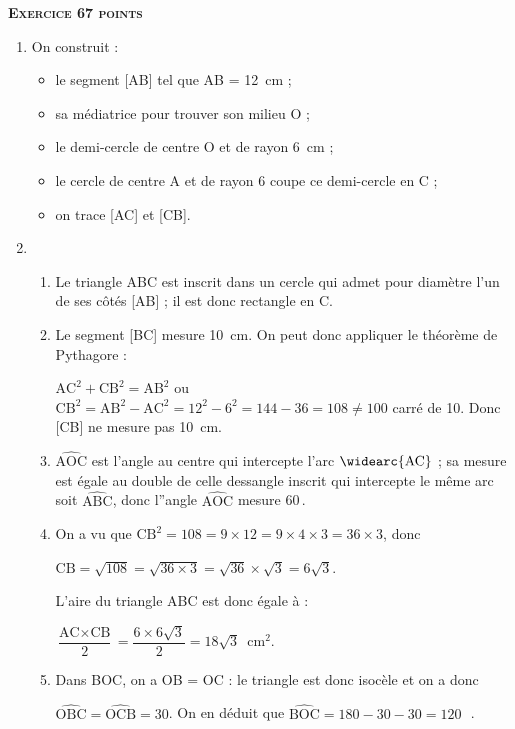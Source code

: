 \textbf{\textsc{Exercice 6\hfill 7 points}}

\medskip

%
%
%

\begin{enumerate}
\item %
On construit :

\begin{itemize}
\item le segment [AB] tel que AB = 12~cm ;
\item sa médiatrice pour trouver son milieu O ;
\item le demi-cercle de centre O et de rayon 6~cm ;
\item le cercle de centre A et de rayon 6 coupe ce demi-cercle en C ;
\item on trace [AC] et [CB].
\end{itemize}

\item %
	\begin{enumerate}
		\item %
Le triangle ABC est inscrit dans un cercle qui admet pour diamètre l'un de ses côtés [AB] ; il est donc rectangle en C.
		\item Le segment [BC] mesure 10~cm.
On peut donc appliquer le théorème de Pythagore :

$\text{AC}^2 + \text{CB}^2 = \text{AB}^2$ ou $\text{CB}^2 = \text{AB}^2 - \text{AC}^2 = 12^2 - 6^2 = 144 - 36 = 108 \ne 100$ carré de 10. Donc [CB] ne mesure pas 10~cm.
		\item %
$\widehat{\text{AOC}}$ est l'angle au centre qui intercepte l'arc $\widearc{\text{AC}}$ ; sa mesure est égale au double de celle dessangle inscrit qui intercepte le même arc soit $\widehat{\text{ABC}}$, donc l''angle $\widehat{\text{AOC}}$ mesure 60\,\degres.
		\item %
On a vu que $\text{CB}^2 = 108 = 9 \times 12 = 9 \times 4 \times 3 = 36 \times 3$, donc 

$\text{CB} = \sqrt{108} = \sqrt{36 \times 3} = \sqrt{36} \times \sqrt{3} = 6\sqrt{3}$.

L'aire du triangle ABC est donc égale à :

$\dfrac{\text{AC} \times \text{CB}}{2} = \dfrac{6 \times 6\sqrt{3}}{2} = 18\sqrt{3}$~cm$^2$.
		\item %
		Dans BOC, on a OB = OC : le triangle est donc isocèle et on a donc 
		
		$\widehat{\text{OBC}} = \widehat{\text{OCB}} = 30$. On en déduit que $\widehat{\text{BOC}} = 180 - 30 - 30 = 120$~\,\degres.
	\end{enumerate}
\end{enumerate}

\vspace{0.5cm}

